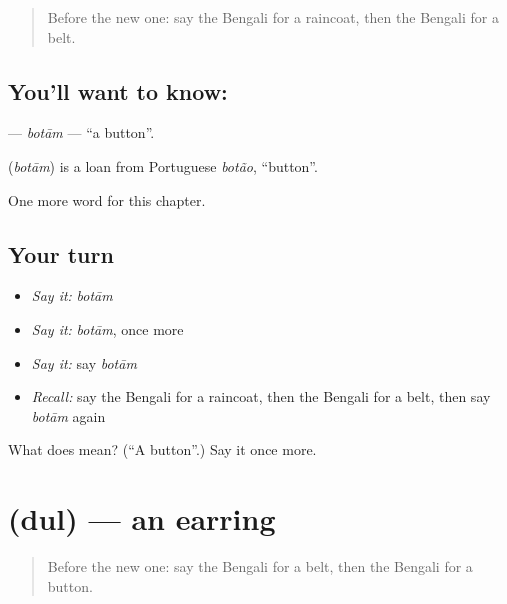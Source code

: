 \label{lesson:BN-C195-botam}



\begin{quote}
Before the new one: say the Bengali for a raincoat, then the Bengali for a belt.
\end{quote}

\subsection*{You'll want to know: }
\textbf{} — \emph{botām} — \textquotedblleft{}a button\textquotedblright{}.

\begin{cousinweb}
\textbf{} (\emph{botām}) is a loan from Portuguese \emph{botão}, \textquotedblleft{}button\textquotedblright{}.
\end{cousinweb}

\begin{grammarlens}[title={What you've built}]
One more word for this chapter.
\end{grammarlens}

\subsection*{Your turn}
\begin{itemize}
\raggedright
  \item \emph{Say it:} \emph{botām}
  \item \emph{Say it:} \emph{botām}, once more
  \item \emph{Say it:} say \emph{botām}
  \item \emph{Recall:} say the Bengali for a raincoat, then the Bengali for a belt, then say \emph{botām} again
\end{itemize}

\begin{tcolorbox}[breakable,colback=teal!4,colframe=teal!35!black,title={Before you move on}]
What does  mean? (\textquotedblleft{}A button\textquotedblright{}.) Say it once more.
\end{tcolorbox}
\section[\texorpdfstring{\bn{দুল} (dul)}{দুল (dul)}]{ (dul) — an earring}

\label{lesson:BN-C195-dul}



\begin{quote}
Before the new one: say the Bengali for a belt, then the Bengali for a button.
\end{quote}

